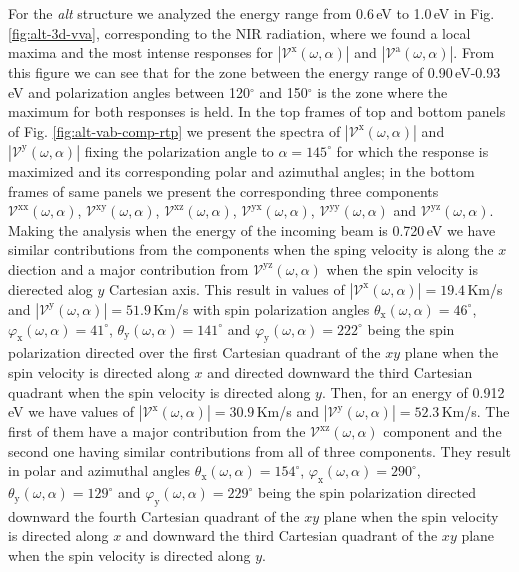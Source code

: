 \documentclass[prb,11pt,tightenlines,twocolumn,aps]{revtex4-1}
\begin{document}
{\color{red} For the \emph{alt} structure we analyzed the energy range from
0.6\,eV to 1.0\,eV in Fig. \ref{fig:alt-3d-vva}, corresponding to the NIR
radiation, where we found a local maxima and the most intense responses for
$|\mathcal{V}^{\mathrm{x}}(\omega,\alpha)|$ and
$|\mathcal{V}^{\mathrm{a}}(\omega,\alpha)|$.}
%
From this figure we can see that for the zone between the energy range of
0.90\,eV-0.93\,eV and polarization angles between 120$^{\circ}$ and
150$^{\circ}$ is the zone where the maximum for both responses is held.
In the top frames of top and bottom panels of Fig. \ref{fig:alt-vab-comp-rtp} we
present the spectra of $|\mathcal{V}^{\mathrm{x}}(\omega,\alpha)|$ and
$|\mathcal{V}^{\mathrm{y}}(\omega,\alpha)|$ fixing the polarization angle to
$\alpha=145^{\circ}$ for which the response is maximized and its corresponding
polar and azimuthal angles; in the bottom frames of same panels we present the
corresponding three components $\mathcal{V}^{\mathrm{xx}}(\omega,\alpha)$,
$\mathcal{V}^{\mathrm{xy}}(\omega,\alpha)$,
$\mathcal{V}^{\mathrm{xz}}(\omega,\alpha)$,
$\mathcal{V}^{\mathrm{yx}}(\omega,\alpha)$,
$\mathcal{V}^{\mathrm{yy}}(\omega,\alpha)$ and
$\mathcal{V}^{\mathrm{yz}}(\omega,\alpha)$.
% 
{\color{red} Making the analysis when the energy of the incoming beam is
0.720\,eV we have similar contributions from the components when the sping
velocity is along the $x$ diection and a major contribution from
$\mathcal{V}^{\mathrm{yz}}(\omega,\alpha)$ when the spin velocity is dierected
alog $y$ Cartesian axis. This result in values of
$|\mathcal{V}^{\mathrm{x}}(\omega,\alpha)| = 19.4$\,Km/s and
$|\mathcal{V}^{\mathrm{y}}(\omega,\alpha)| = 51.9$\,Km/s with spin polarization
angles $\theta_{\mathrm{x}}(\omega,\alpha) = 46^{\circ}$,
$\varphi_{\mathrm{x}}(\omega,\alpha) = 41^{\circ}$,
$\theta_{\mathrm{y}}(\omega,\alpha) = 141^{\circ}$ and
$\varphi_{\mathrm{y}}(\omega,\alpha) = 222^{\circ}$ being the spin polarization
directed over the first Cartesian quadrant of the $xy$ plane when the spin
velocity is directed along $x$ and directed downward the third Cartesian
quadrant when the spin velocity is directed along $y$.
% 
Then, for an energy of 0.912\,eV we have values of
$|\mathcal{V}^{\mathrm{x}}(\omega,\alpha)|=30.9$\,Km/s and
$|\mathcal{V}^{\mathrm{y}}(\omega,\alpha)| = 52.3$\,Km/s. The first of them have
a major contribution from the $\mathcal{V}^{\mathrm{xz}}(\omega,\alpha)$
component and the second one having similar contributions from all of three
components. They result in polar and azimuthal angles
$\theta_{\mathrm{x}}(\omega,\alpha) = 154^{\circ}$,
$\varphi_{\mathrm{x}}(\omega,\alpha) = 290^{\circ}$,
$\theta_{\mathrm{y}}(\omega,\alpha) = 129^{\circ}$ and
$\varphi_{\mathrm{y}}(\omega,\alpha) = 229^{\circ}$ being the spin polarization
directed downward the fourth Cartesian quadrant of the $xy$ plane when the spin
velocity is directed along $x$ and downward the third Cartesian quadrant of the
$xy$ plane when the spin velocity is directed along $y$.}
\end{document}
